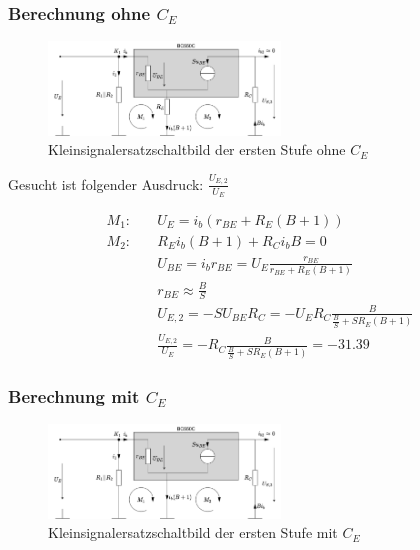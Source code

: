 \subsubsection{Berechnung ohne $C_E$}

\begin{figure}[H]
    \centering
    \includegraphics[width = 0.55\textwidth]{tex/1_Microphone/pictures/KKSESB_ohne_CE.pdf}
    \caption{Kleinsignalersatzschaltbild der ersten Stufe ohne $C_E$}
    \label{fig:my_label}
\end{figure}

Gesucht ist folgender Ausdruck: $\frac{U_{E,2}}{U_E}$

\begin{align*}
    M_1:& \quad U_E = i_b \left( r_{BE} + R_E \left( B + 1\right) \right) \\
    M_2:& \quad R_E i_b (B+1) + R_C i_b B = 0 \\
    {} & \quad U_{BE} = i_b r_{BE} = U_E \frac{r_{BE}}{r_{BE}+R_E(B+1)}\\
    {} & \quad r_{BE} \approx \frac{B}{S}\\
    {} & \quad U_{E,2} = - S U_{BE} R_C = - U_E R_C \frac{B}{\frac{B}{S}+S R_E(B+1)}\\
    & \quad \frac{U_{E,2}}{U_E} = - R_C \frac{B}{\frac{B}{S}+S R_E(B+1)} = -31.39
\end{align*}

\subsubsection{Berechnung mit $C_E$}

\begin{figure}[H]
    \centering
    \includegraphics[width = 0.55\textwidth]{tex/1_Microphone/pictures/KKSESB_mit_CE.pdf}
    \caption{Kleinsignalersatzschaltbild der ersten Stufe mit $C_E$}
    \label{fig:my_label}
\end{figure}


